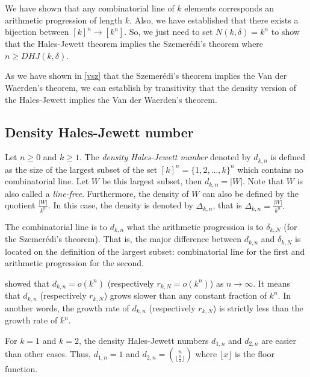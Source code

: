 We have shown that any combinatorial line of $k$ elements corresponds an arithmetic progression of length $k.$ Also, we have established that there exists a bijection between $[k]^n \longrightarrow [k^n].$ So, we just need to set $N(k,\delta)=k^n$ to show that the Hales-Jewett theorem implies the Szemerédi's theorem where $n\geq DHJ(k,\delta).$

As we have shown in \eqref{vsz} that the Szemerédi's theorem implies the  Van der Waerden's theorem, we can establish by transitivity that the density version of the Hales-Jewett implies the Van der Waerden's theorem.

\subsection{Density Hales-Jewett number} \label{dhjn}

Let $n \geq 0$ and $k \geq 1.$ The \textit{density Hales-Jewett number}	denoted by $d_{k,n}$ is defined as the size of the largest subset of the set $[k]^n=\{1,2, \ldots, k\}^n$ which contains no combinatorial	line.  Let $W$ be this largest subset, then $d_{k,n}=|W|.$  Note that $W$ is also called a \textit{line-free}. Furthermore, the density of $W$ can also be defined by the quotient $\frac{|W|}{k^n}$. In this case, the density is denoted by $\Delta_{k,n}$, that is  $\Delta_{k,n}=\frac{|W|}{k^n}.$ 

The combinatorial line is to $d_{k,n}$ what the arithmetic progression is to $\delta_{k,N}$ (for the Szemerédi's theorem). That is, the major  difference between $d_{k,n}$ and $\delta_{k,N}$ is located on the definition of the largest subset: combinatorial line for the first and arithmetic progression for the second. 

\cite*{furstenberg1991density} showed that $d_{k,n}=o(k^n)$ (respectively $r_{k,N}=o(k^n)$) as $n\longrightarrow \infty.$
It means that $d_{k,n}$ (respectively $r_{k,N}$) grows slower than  any constant fraction of $k^n$.
In another words, the growth rate of $d_{k,n}$ (respectively $r_{k,N}$) is strictly less
than the growth rate of $k^n.$

For $k=1$ and $k=2$, the density Hales-Jewett numbers $d_{1,n}$ and $d_{2,n}$ are easier   than other cases.
Thus, $d_{1,n}=1$ and $d_{2,n}= {n \choose \lfloor \frac{n}{2} \rfloor}$ where $\lfloor x \rfloor $ is the floor function. 

